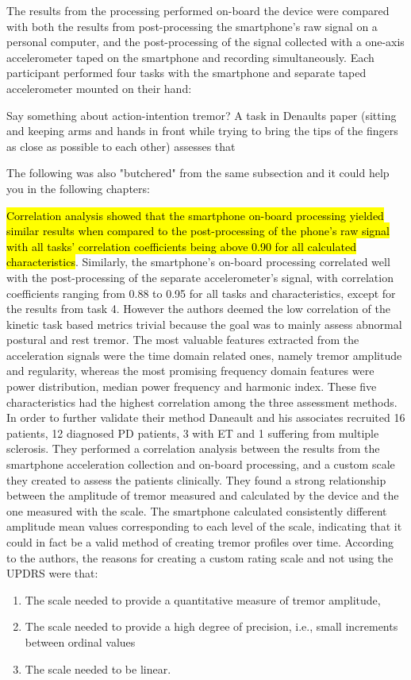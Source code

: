 The results from the processing performed on-board the device were compared with both the results from post-processing the smartphone's raw signal on a personal computer, and the post-processing of the signal collected with a one-axis accelerometer taped on the smartphone and recording simultaneously. Each participant performed four tasks with the smartphone and separate taped accelerometer mounted on their hand:

Say something about action-intention tremor? A task in Denaults paper (sitting and keeping arms and hands in front while trying to bring the tips of the fingers as close as possible to each other) assesses that

The following was also "butchered" from the same subsection and it could help you in the following chapters:

\hl{Correlation analysis showed that the smartphone on-board processing yielded similar results when compared to the post-processing of the phone's raw signal with all tasks' correlation coefficients being above 0.90 for all calculated characteristics}. Similarly, the smartphone's on-board processing correlated well with the post-processing of the separate accelerometer's signal, with correlation coefficients ranging from 0.88 to 0.95 for all tasks and characteristics, except for the results from task 4. However the authors deemed the low correlation of the kinetic task based metrics trivial because the goal was to mainly assess abnormal postural and rest tremor. The most valuable features extracted from the acceleration signals were the time domain related ones, namely tremor amplitude and regularity, whereas the most promising frequency domain features were power distribution, median power frequency and harmonic index. These five characteristics had the highest correlation among the three assessment methods. In order to further validate their method Daneault and his associates recruited 16 patients, 12 diagnosed PD patients, 3 with ET and 1 suffering from multiple sclerosis. They performed a correlation analysis between the results from the smartphone acceleration collection and on-board processing, and a custom scale they created to assess the patients clinically. They found a strong relationship between the amplitude of tremor measured and calculated by the device and the one measured with the scale. The smartphone calculated consistently different amplitude mean values corresponding to each level of the scale, indicating that it could in fact be a valid method of creating tremor profiles over time. 
According to the authors, the reasons for creating a custom rating scale and not using the UPDRS were that:\par
\begin{enumerate}
\item The scale needed to provide a quantitative measure of tremor amplitude, 
\item The scale needed to provide a high degree of precision, i.e., small increments between ordinal values
\item The scale needed to be linear.
\end{enumerate}